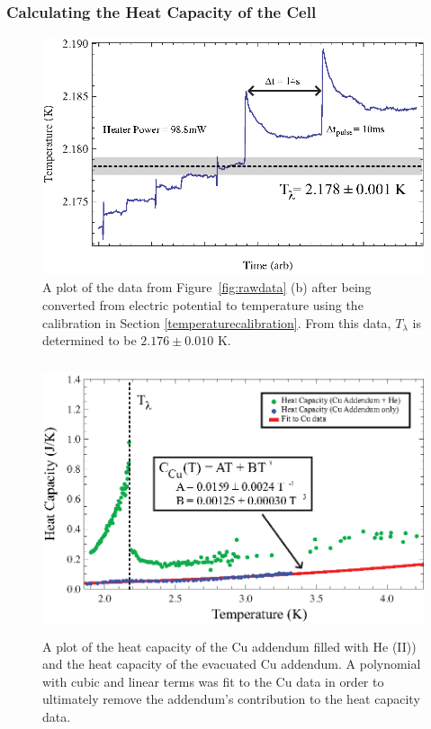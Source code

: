\subsubsection{Calculating the Heat Capacity of the Cell}\label{calculatingtheheatcapacityofthecell}

\begin{figure}[htbp]
\begin{center}
\includegraphics[height=70mm]{./figures/heatingdata.eps}
\caption{\small{A plot of the data from Figure~\ref{fig:rawdata} (b) after being converted from electric potential to temperature using the calibration in Section \ref{temperaturecalibration}.  From this data, $T_{\lambda}$ is determined to be $2.176\pm0.010$ K.}}
\label{fig:heatingdata}
\end{center}
\end{figure}

\begin{figure}[htbp]
\begin{center}
\includegraphics[height=80mm]{./figures/lambdanorm.eps}
\caption{\small{A plot of the heat capacity of the Cu addendum filled with He (II)) and the heat capacity of the evacuated Cu addendum.  A polynomial with cubic and linear terms was fit to the Cu data in order to ultimately remove the addendum's contribution to the heat capacity data.}}
\label{fig:lambdanorm}
\end{center}
\end{figure}

